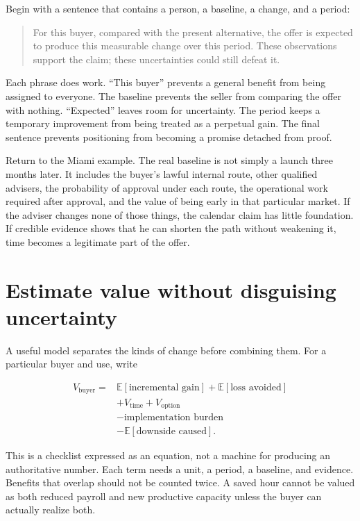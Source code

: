 Begin with a sentence that contains a person, a baseline, a change, and a
period:

\begin{quote}
For this buyer, compared with the present alternative, the offer is expected
to produce this measurable change over this period. These observations support
the claim; these uncertainties could still defeat it.
\end{quote}

Each phrase does work. ``This buyer'' prevents a general benefit from being
assigned to everyone. The baseline prevents the seller from comparing the
offer with nothing. ``Expected'' leaves room for uncertainty. The period keeps
a temporary improvement from being treated as a perpetual gain. The final
sentence prevents positioning from becoming a promise detached from proof.

Return to the Miami example. The real baseline is not simply a launch three
months later. It includes the buyer's lawful internal route, other qualified
advisers, the probability of approval under each route, the operational work
required after approval, and the value of being early in that particular
market. If the adviser changes none of those things, the calendar claim has
little foundation. If credible evidence shows that he can shorten the path
without weakening it, time becomes a legitimate part of the offer.

\section{Estimate value without disguising uncertainty}

A useful model separates the kinds of change before combining them. For a
particular buyer and use, write

\begin{equation}
\begin{aligned}
V_{\mathrm{buyer}}={}&
  \mathbb{E}[\text{incremental gain}]
  + \mathbb{E}[\text{loss avoided}]\\
 &+ V_{\mathrm{time}} + V_{\mathrm{option}} \\
 &- \text{implementation burden}\\
 &- \mathbb{E}[\text{downside caused}].
\end{aligned}
\end{equation}

This is a checklist expressed as an equation, not a machine for producing an
authoritative number. Each term needs a unit, a period, a baseline, and
evidence. Benefits that overlap should not be counted twice. A saved hour
cannot be valued as both reduced payroll and new productive capacity unless
the buyer can actually realize both.

